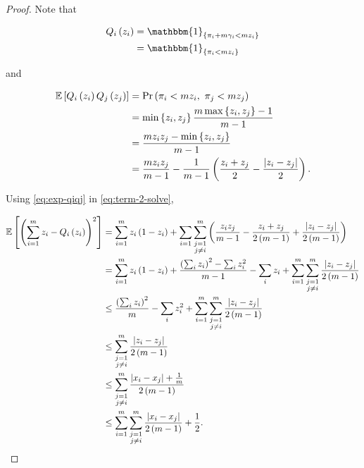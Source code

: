 \documentclass[twoside]{article}
\begin{document}
\begin{proof}
    Note that

    \begin{align}
        Q_i\brak{z_i} &= \mathbbm{1}_{\cbrak{\pi_i+m\gamma_i<mz_i}} \\
                      &= \mathbbm{1}_{\cbrak{\pi_i<mz_i}}
                      \label{eq:Qi-alt-def}
    \end{align}

    and

    \begin{align}
        \mean{Q_i\brak{z_i}Q_j\brak{z_j}} &= \pr{\pi_i<mz_i,\ \pi_j<mz_j} \\
                                          &= \min\cbrak{z_i,z_j}\frac{m\max\cbrak{z_i,z_j}-1}{m-1} \\
                                          &= \frac{mz_iz_j-\min\cbrak{z_i,z_j}}{m-1} \\
                                          &= \frac{mz_iz_j}{m-1} - \frac{1}{m-1}\brak{\frac{z_i+z_j}{2}-\frac{\abs{z_i-z_j}}{2}}.
                                          \label{eq:exp-qiqj}
    \end{align}

    Using \eqref{eq:exp-qiqj} in \eqref{eq:term-2-solve},

    \begin{align}
        \mathbb{E}\left[ \left(\sum_{i=1}^mz_i-Q_i\left(z_i\right)\right)^2 \right] &= \sum_{i=1}^mz_i\left(1-z_i\right) + \sum_{i=1}\sum_{\substack{j=1\\j\neq i}}^m \left(\frac{z_iz_j}{m-1} - \frac{z_i+z_j}{2\left(m-1\right)} + \frac{\left\vert z_i-z_j\right\vert}{2\left(m-1\right)}\right) \\
                                                      &= \sum_{i=1}^mz_i\left(1-z_i\right) + \frac{\left(\sum_iz_i\right)^2-\sum_iz_i^2}{m-1} - \sum_iz_i + \sum_{i=1}^m\sum_{\substack{j=1\\j\neq i}}^m\frac{\left\vert z_i-z_j\right\vert}{2\left(m-1\right)} \\
                                                      &\le \frac{\left(\sum_iz_i\right)^2}{m} - \sum_iz_i^2 + \sum_{i=1}^m\sum_{\substack{j=1\\j\neq i}}^m\frac{\left\vert z_i-z_j\right\vert}{2\left(m-1\right)} \\
                                                      &\le \sum_{\substack{j=1\\j\neq i}}^m\frac{\left\vert z_i-z_j\right\vert}{2\left(m-1\right)} \\
                                                      &\le \sum_{\substack{j=1\\j\neq i}}^m\frac{\left\vert x_i-x_j\right\vert+\frac{1}{m}}{2\left(m-1\right)} \\
                                                      &\le \sum_{i=1}^m\sum_{\substack{j=1\\j\neq i}}^m\frac{\left\vert x_i-x_j\right\vert}{2\left(m-1\right)} + \frac{1}{2}.
                                                      \label{eq:term-2}
    \end{align}


\end{proof}
\end{document}
